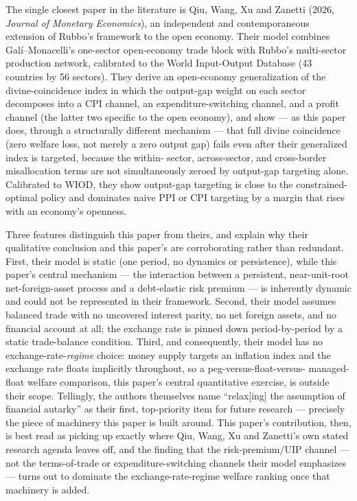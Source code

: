 \documentclass[12pt]{article}
\begin{document}
The single closest paper in the literature is Qiu, Wang, Xu and Zanetti (2026, \emph{Journal of
Monetary Economics}), an independent and contemporaneous extension of Rubbo's framework to the open
economy. Their model combines Gal\'i--Monacelli's one-sector open-economy trade block with Rubbo's
multi-sector production network, calibrated to the World Input-Output Database (43 countries by 56
sectors). They derive an open-economy generalization of the divine-coincidence index in which the
output-gap weight on each sector decomposes into a CPI channel, an expenditure-switching channel, and
a profit channel (the latter two specific to the open economy), and show --- as this paper does,
through a structurally different mechanism --- that full divine coincidence (zero welfare loss, not
merely a zero output gap) fails even after their generalized index is targeted, because the within-
sector, across-sector, and cross-border misallocation terms are not simultaneously zeroed by
output-gap targeting alone. Calibrated to WIOD, they show output-gap targeting is close to the
constrained-optimal policy and dominates naive PPI or CPI targeting by a margin that rises with an
economy's openness.

Three features distinguish this paper from theirs, and explain why their qualitative conclusion and
this paper's are corroborating rather than redundant. First, their model is static (one period, no
dynamics or persistence), while this paper's central mechanism --- the interaction between a
persistent, near-unit-root net-foreign-asset process and a debt-elastic risk premium --- is
inherently dynamic and could not be represented in their framework. Second, their model assumes
balanced trade with no uncovered interest parity, no net foreign assets, and no financial account at
all; the exchange rate is pinned down period-by-period by a static trade-balance condition. Third,
and consequently, their model has no exchange-rate-\emph{regime} choice: money supply targets an
inflation index and the exchange rate floats implicitly throughout, so a peg-versus-float-versus-
managed-float welfare comparison, this paper's central quantitative exercise, is outside their scope.
Tellingly, the authors themselves name ``relax[ing] the assumption of financial autarky'' as their
first, top-priority item for future research --- precisely the piece of machinery this paper is built
around. This paper's contribution, then, is best read as picking up exactly where Qiu, Wang, Xu and
Zanetti's own stated research agenda leaves off, and the finding that the risk-premium/UIP channel
--- not the terms-of-trade or expenditure-switching channels their model emphasizes --- turns out to
dominate the exchange-rate-regime welfare ranking once that machinery is added.
\end{document}

